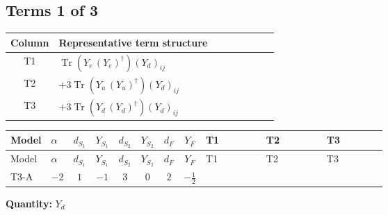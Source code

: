 \documentclass[8pt]{article}
\begin{document}
\begin{landscape}
\subsection*{Terms 1 of 3}
\begin{center}
\begin{tabular}{@{}c >{\raggedright\arraybackslash}p{0.82\linewidth}@{}}
\toprule
Column & Representative term structure \\
\midrule
T1 & \(\displaystyle \operatorname{Tr}\!\left({Y_e}\,\left({Y_e}\right)^{\dagger}\right) \left({Y_d}\right)_{ij}\) \\
\midrule
T2 & \(\displaystyle +3 \operatorname{Tr}\!\left({Y_u}\,\left({Y_u}\right)^{\dagger}\right) \left({Y_d}\right)_{ij}\) \\
\midrule
T3 & \(\displaystyle +3 \operatorname{Tr}\!\left({Y_d}\,\left({Y_d}\right)^{\dagger}\right) \left({Y_d}\right)_{ij}\) \\
\midrule
\bottomrule
\end{tabular}
\end{center}
\smallskip
\tiny
\begin{longtable}{@{}llcccccc >{\raggedright\arraybackslash}p{0.21\linewidth} >{\raggedright\arraybackslash}p{0.21\linewidth} >{\raggedright\arraybackslash}p{0.21\linewidth}@{}}
\toprule
Model & $\alpha$ & $d_{S_1}$ & $Y_{S_1}$ & $d_{S_2}$ & $Y_{S_2}$ & $d_F$ & $Y_F$ & T1 & T2 & T3 \\
\midrule
\endfirsthead
\toprule
Model & $\alpha$ & $d_{S_1}$ & $Y_{S_1}$ & $d_{S_2}$ & $Y_{S_2}$ & $d_F$ & $Y_F$ & T1 & T2 & T3 \\
\midrule
\endhead
T3-A & $-2$ & $1$ & $-1$ & $3$ & $0$ & $2$ & $-\frac{1}{2}$ & \scriptsize\adjustbox{max width=\linewidth}{$\begin{gathered} \operatorname{Tr}\!\left({Y_e}\,\left({Y_e}\right)^{\dagger}\right) \left({Y_d}\right)_{ij}\end{gathered}$} & \scriptsize\adjustbox{max width=\linewidth}{$\begin{gathered} +3 \operatorname{Tr}\!\left({Y_u}\,\left({Y_u}\right)^{\dagger}\right) \left({Y_d}\right)_{ij}\end{gathered}$} & \scriptsize\adjustbox{max width=\linewidth}{$\begin{gathered} +3 \operatorname{Tr}\!\left({Y_d}\,\left({Y_d}\right)^{\dagger}\right) \left({Y_d}\right)_{ij}\end{gathered}$} \\
\midrule
\bottomrule
\end{longtable}
\clearpage
\noindent\textbf{Quantity: }$Y_d$\par\smallskip

\end{landscape}
\end{document}
